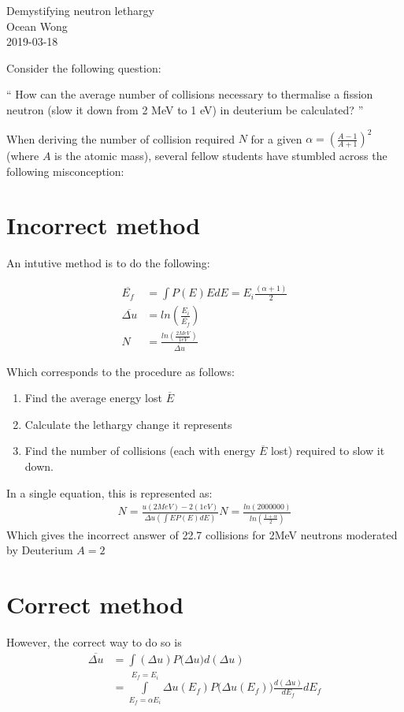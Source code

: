 \documentclass[a4paper, 12pt]{article}
\begin{document}
\begin{center}
Demystifying neutron lethargy			\\
Ocean Wong								\\
2019-03-18
\end{center}

Consider the following question:

`` 
How can the average number of collisions necessary to thermalise a fission neutron (slow
it down from 2 MeV to 1 eV) in deuterium be calculated?
'' 

When deriving the number of collision required $N$ for a given $\alpha = (\frac{A-1}{A+1})^2$ (where $A$ is the atomic mass), several fellow students have stumbled across the following misconception:

\section{Incorrect method}\label{Incorrect}
An intutive method is to do the following:

\begin{align}
	\overline{E_f} &= \int P(E) E dE =  {E_i} \frac{(\alpha+1)}{2} \\
	\overline{\Delta u} &= ln \left( \frac{E_i}{\overline{E_f}} \right)	\\
	N &= \frac{ ln \left( \frac{2 MeV}{1eV} \right)} { \overline{\Delta u} }
\end{align}

Which corresponds to the procedure as follows:
\begin{enumerate}
	\item Find the average energy lost $\overline{E}$
	\item Calculate the lethargy change it represents
	\item Find the number of collisions (each with energy $\overline{E}$ lost) required to slow it down.
\end{enumerate}

In a single equation, this is represented as:
\begin{align}
	N=\frac{u(2MeV) - 2(1eV)}{\Delta u \left(\int E P(E) dE \right) }
	N=\frac{ln\left(2000000\right)}{ln\left(\frac{1+\alpha}{2} \right)}
\end{align}
Which gives the incorrect answer of 22.7 collisions for 2MeV neutrons moderated by Deuterium $A=2$

\section{Correct method} \label{Correct}
	However, the correct way to do so is 
\begin{align}
	\overline{\Delta u} &= \int (\Delta u) P\big(\Delta u \big) d(\Delta u)	\\
		&= \int\limits_{E_f=\alpha E_i}^{E_f=E_i} \Delta u (E_f) P\big(\Delta u (E_f) \big) \frac{d(\Delta u)}{dE_f} dE_f \label{scaleUprob}
\end{align}
\end{document}
